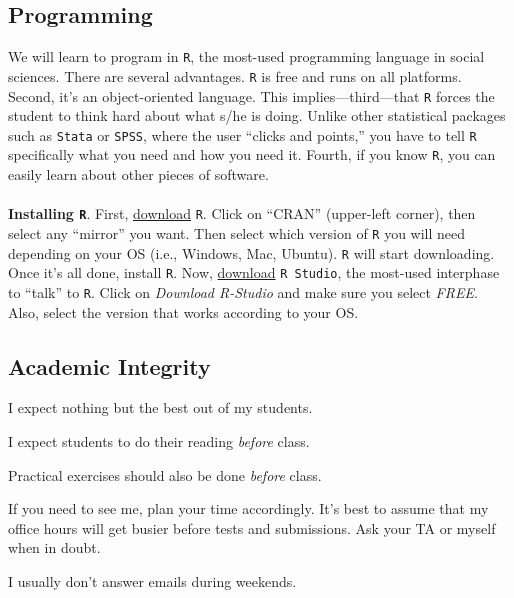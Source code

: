 \documentclass[letterpaper]{article}
\renewenvironment{itemize}{
  \begin{list}{}{
    \setlength{\leftmargin}{1.5em}
  }
}{
  \end{list}
}
\begin{document}
\subsection*{Programming}

We will learn to program in \texttt{R}, the most-used programming language in social sciences. There are several advantages. \texttt{R} is free and runs on all platforms. Second, it's an object-oriented language. This implies---third---that \texttt{R} forces the student to think hard about what s/he is doing. Unlike other statistical packages such as \texttt{Stata} or \texttt{SPSS}, where the user ``clicks and points,'' you have to tell \texttt{R} specifically what you need and how you need it. Fourth, if you know \texttt{R}, you can easily learn about other pieces of software.
\\
\\
{\bf Installing \texttt{R}}. First, \href{https://www.r-project.org/}{download} \texttt{R}. Click on ``CRAN'' (upper-left corner), then select any ``mirror'' you want. Then select which version of \texttt{R} you will need depending on your OS (i.e., Windows, Mac, Ubuntu). \texttt{R} will start downloading. Once it's all done, install \texttt{R}. Now, \href{https://www.rstudio.com}{download} \texttt{R Studio}, the most-used interphase to ``talk'' to \texttt{R}. Click on \emph{Download R-Studio} and make sure you select \emph{FREE}. Also, select the version that works according to your OS.


\subsection*{Academic Integrity}

I expect nothing but the best out of my students. 

\begin{itemize}
     \item[$\circ$] I expect students to do their reading \emph{before} class.
     \item[$\circ$] Practical exercises should also be done \emph{before} class. 
     \item[$\circ$] If you need to see me, plan your time accordingly. It's best to assume that my office hours will get busier before tests and submissions. Ask your TA or myself when in doubt. 

  \item[$\circ$] I usually don't answer emails during weekends. 
\end{itemize}
\end{document}
